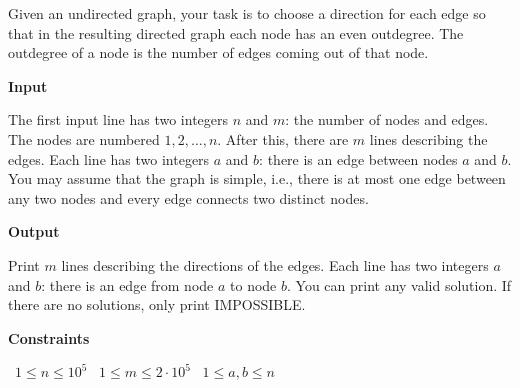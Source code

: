 Given an undirected graph, your task is to choose a direction for each edge so that in the resulting directed graph each node has an even outdegree. The outdegree of a node is the number of edges coming out of that node.

\vspace{0.3cm}\noindent\textbf{Input}

The first input line has two integers $n$ and $m$: the number of nodes and edges. The nodes are numbered $1,2,\dots,n$.
After this, there are $m$ lines describing the edges. Each line has two integers $a$ and $b$: there is an edge between nodes $a$ and $b$.
You may assume that the graph is simple, i.e., there is at most one edge between any two nodes and every edge connects two distinct nodes.

\vspace{0.3cm}\noindent\textbf{Output}

Print $m$ lines describing the directions of the edges. Each line has two integers $a$ and $b$: there is an edge from node $a$ to node $b$. You can print any valid solution.
If there are no solutions, only print IMPOSSIBLE.

\vspace{0.3cm}\noindent\textbf{Constraints}

\textbullet\ $1 \le n \le 10^5$
\textbullet\ $1 \le m \le 2 \cdot 10^5$
\textbullet\ $1 \le a,b \le n$